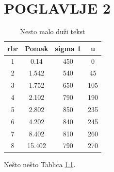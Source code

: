 \chapter{\uppercase{Poglavlje 2}}


\lipsum[1-3]


\begin{table}
	\centering
	\caption{Nesto malo duži tekst}
	\label{tab:red}
\begin{tabular}{c c c c}
	\hline
	rbr & Pomak & sigma 1 & u \\ \hline
	1 & 0.14 & 450 & 0 \\ \hline
	2 & 1.542 & 540 & 45 \\ \hline
	3 & 1.752 & 650 & 105 \\ \hline
	4 & 2.102 & 790 & 190 \\ \hline
	5 & 2.802 & 850 & 235 \\ \hline
	6 & 4.202 & 840 & 245 \\ \hline
	7 & 8.402 & 810 & 260 \\ \hline
	8 & 15.402 & 790 & 270 \\ \hline
\end{tabular}

\end{table}


\lipsum[1-3] \cite{Massoudi2001}
Nešto nešto Tablica \ref{tab:red}.